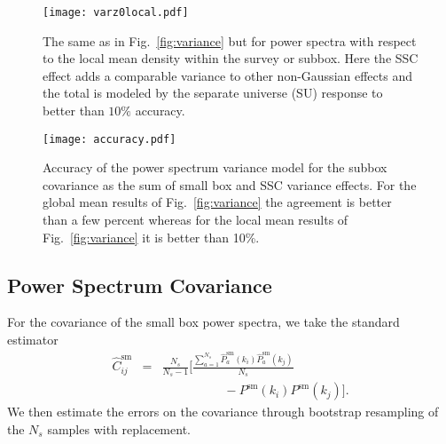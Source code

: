 \documentclass[prd,twocolumn,amsmath,amssymb,floatfix,superscriptaddress]{revtex4-1}
\begin{document}
\begin{figure}[t]
    \centering
        \texttt{[image: varz0local.pdf]}
    \caption{\footnotesize The same as in Fig.~\ref{fig:variance} but for power spectra with
    respect to the local mean density within the survey or subbox.  Here the SSC effect adds a comparable variance to other non-Gaussian effects and the total is modeled by the
    separate universe (SU) response to better than $10\%$ accuracy.}
    \label{fig:variancelocal}
\end{figure}

\begin{figure}[t]
    \centering
        \texttt{[image: accuracy.pdf]}
        \caption{\footnotesize    Accuracy of the power spectrum variance model for the
        subbox covariance as the sum of small box and SSC variance effects. 
        For the global mean results of Fig.~\ref{fig:variance} the agreement is better
        than a few percent whereas for the local mean results of Fig.~\ref{fig:variance} it is
        better than 10\%.}
    \label{fig:varianceratio}
\end{figure}

\subsection{Power Spectrum Covariance}
\label{sub:super_sample_covariance}


For the covariance of the small box power spectra, we take the standard estimator 
\begin{eqnarray}
\hat C_{ij}^\text{sm} &=& \frac{N_s}{N_s-1} \Bigg[ \frac{\sum_{a=1}^{N_s} \hat P_a^\text{sm}(k_i)
\hat P_a^\text{sm}(k_j)}{N_s}\nonumber\\
 &&\hspace{5em} 
-  P^\text{sm}(k_i)P^\text{sm}(k_j)  \Bigg].
\end{eqnarray}
We then estimate the errors on the covariance through bootstrap resampling of the $N_s$ 
samples with replacement.
\end{document}
